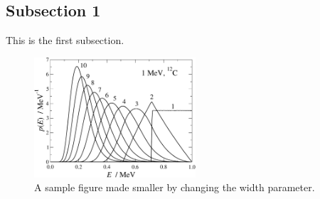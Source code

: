 \documentclass[twocolumn]{revtex4}
\begin{document}
\subsection{Subsection 1}

This is the first subsection.
\begin{figure}[h!]
\centering
\includegraphics[width=6.0cm]{fig1.pdf}
\caption{A sample figure made smaller by changing the width parameter.}
\label{fig:small_sample}
\end{figure}
\end{document}
